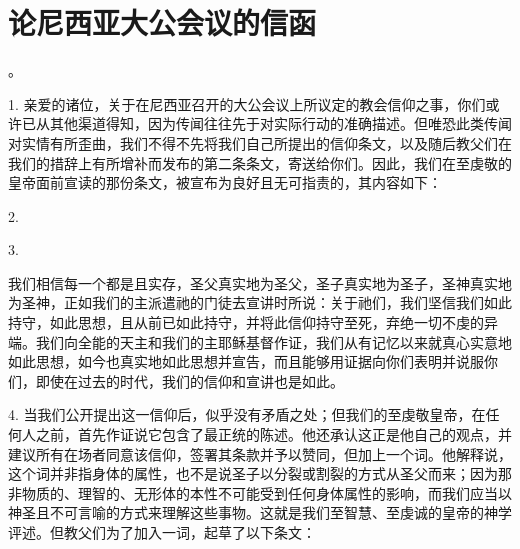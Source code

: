 
\chapter{论尼西亚大公会议的信函}


。\par

1. 亲爱的诸位，关于在尼西亚召开的大公会议上所议定的教会信仰之事，你们或许已从其他渠道得知，因为传闻往往先于对实际行动的准确描述。但唯恐此类传闻对实情有所歪曲，我们不得不先将我们自己所提出的信仰条文，以及随后教父们在我们的措辞上有所增补而发布的第二条条文，寄送给你们。因此，我们在至虔敬的皇帝面前宣读的那份条文，被宣布为良好且无可指责的，其内容如下：\par

2. \par

3. \par

我们相信每一个都是且实存，圣父真实地为圣父，圣子真实地为圣子，圣神真实地为圣神，正如我们的主派遣祂的门徒去宣讲时所说：关于祂们，我们坚信我们如此持守，如此思想，且从前已如此持守，并将此信仰持守至死，弃绝一切不虔的异端。我们向全能的天主和我们的主耶稣基督作证，我们从有记忆以来就真心实意地如此思想，如今也真实地如此思想并宣告，而且能够用证据向你们表明并说服你们，即使在过去的时代，我们的信仰和宣讲也是如此。\par

4. 当我们公开提出这一信仰后，似乎没有矛盾之处；但我们的至虔敬皇帝，在任何人之前，首先作证说它包含了最正统的陈述。他还承认这正是他自己的观点，并建议所有在场者同意该信仰，签署其条款并予以赞同，但加上一个词。他解释说，这个词并非指身体的属性，也不是说圣子以分裂或割裂的方式从圣父而来；因为那非物质的、理智的、无形体的本性不可能受到任何身体属性的影响，而我们应当以神圣且不可言喻的方式来理解这些事物。这就是我们至智慧、至虔诚的皇帝的神学评述。但教父们为了加入一词，起草了以下条文：\par

